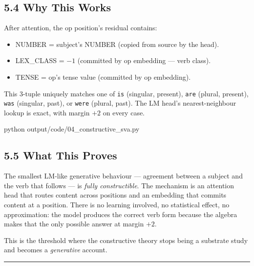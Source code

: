 \documentclass[
  twocolumn,
  10pt,
  a4paper]{article}
\newenvironment{Shaded}{}{}
\newcommand{\ExtensionTok}[1]{#1}
\newcommand{\NormalTok}[1]{#1}
\providecommand{\tightlist}{%
  \setlength{\itemsep}{0pt}\setlength{\parskip}{0pt}}
\begin{document}
\hypertarget{why-this-works}{%
\subsection{5.4 Why This Works}\label{why-this-works}}

After attention, the op position's residual contains:

\begin{itemize}
\tightlist
\item
  NUMBER = subject's NUMBER (copied from source by the head).
\item
  LEX\_CLASS = \(-1\) (committed by op embedding --- verb class).
\item
  TENSE = op's tense value (committed by op embedding).
\end{itemize}

This 3-tuple uniquely matches one of \texttt{is} (singular, present),
\texttt{are} (plural, present), \texttt{was} (singular, past), or
\texttt{were} (plural, past). The LM head's nearest-neighbour lookup is
exact, with margin \(+2\) on every case.

\begin{Shaded}
\begin{Highlighting}[]
\ExtensionTok{python}\NormalTok{ output/code/04\_constructive\_sva.py}
\end{Highlighting}
\end{Shaded}

\hypertarget{what-this-proves-3}{%
\subsection{5.5 What This Proves}\label{what-this-proves-3}}

The smallest LM-like generative behaviour --- agreement between a
subject and the verb that follows --- is \emph{fully constructible}. The
mechanism is an attention head that routes content across positions and
an embedding that commits content at a position. There is no learning
involved, no statistical effect, no approximation: the model produces
the correct verb form because the algebra makes that the only possible
answer at margin \(+2\).

This is the threshold where the constructive theory stops being a
substrate study and becomes a \emph{generative} account.

\begin{center}\rule{0.5\linewidth}{0.5pt}\end{center}
\end{document}
